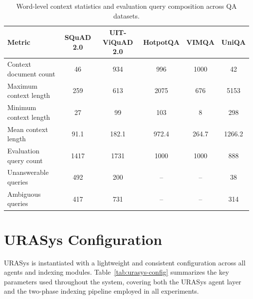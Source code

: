 \documentclass[11pt]{article}
\begin{document}
\begin{table}[t]
\centering
\caption{Word-level context statistics and evaluation query composition across QA datasets.}
\label{tab:context-length}
\begin{tabular}{l|cc|cc|c}
\toprule
\textbf{Metric} & \textbf{SQuAD 2.0} & \textbf{UIT-ViQuAD 2.0} & \textbf{HotpotQA} & \textbf{VIMQA} & \textbf{UniQA} \\
\midrule
Context document count       & 46     & 934     & 996    & 1000   & 42     \\ \midrule
Maximum context length       & 259    & 613   & 2075   & 676    & 5153   \\
Minimum context length       & 27     & 99    & 103    & 8      & 298    \\ 
Mean context length          & 91.1   & 182.1 & 972.4  & 264.7  & 1266.2 \\ \midrule
Evaluation query count   &  1417  &  1731     & 1000   & 1000   &   888   \\

Unanswerable queries         & 492    & 200   & --     & --     & 38     \\
Ambiguous queries         & 417   & 731   & --     & --     & 314     \\
\bottomrule
\end{tabular}
\end{table}

\section{URASys Configuration}
URASys is instantiated with a lightweight and consistent configuration across all agents and indexing modules. 
Table~\ref{tab:urasys-config} summarizes the key parameters used throughout the system, covering both the URASys agent layer 
and the two-phase indexing pipeline employed in all experiments.
\end{document}
